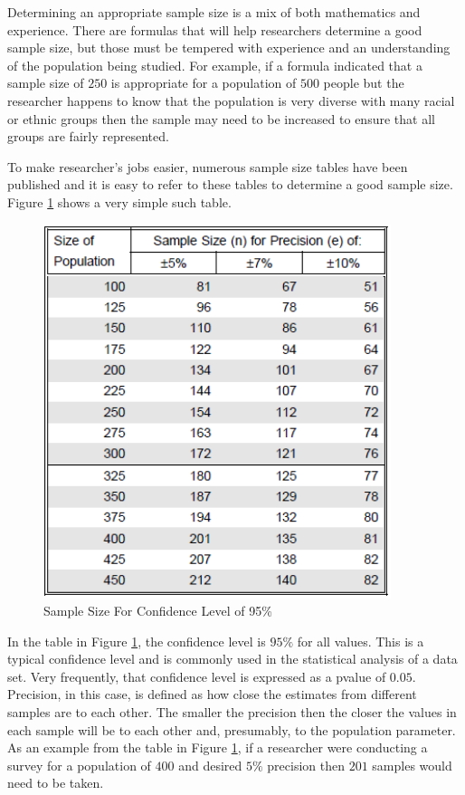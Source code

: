 Determining an appropriate sample size is a mix of both mathematics and experience. There are formulas that will help researchers determine a good sample size, but those must be tempered with experience and an understanding of the population being studied. For example, if a formula indicated that a sample size of $ 250 $ is appropriate for a population of $ 500 $ people but the researcher happens to know that the population is very diverse with many racial or ethnic groups then the sample may need to be increased to ensure that all groups are fairly represented.

To make researcher's jobs easier, numerous sample size tables have been published and it is easy to refer to these tables to determine a good sample size. Figure \ref{07:fig14} shows a very simple such table\cite{israel1992determining}.

\begin{figure}[H]
	\centering
	\includegraphics[width=4in]{gfx/07-14}
	\caption{Sample Size For Confidence Level of 95\%}
	\label{07:fig14}
\end{figure}

In the table in Figure \ref{07:fig14}, the confidence level is $ 95\% $ for all values. This is a typical confidence level and is commonly used in the statistical analysis of a data set. Very frequently, that confidence level is expressed as a \gls{pvalue} of $ 0.05 $. Precision, in this case, is defined as how close the estimates from different samples are to each other. The smaller the precision then the closer the values in each sample will be to each other and, presumably, to the population parameter. As an example from the table in Figure \ref{07:fig14}, if a researcher were conducting a survey for a population of $ 400 $ and desired $ 5\% $ precision then $ 201 $ samples would need to be taken.

